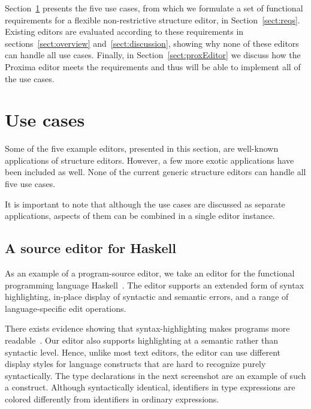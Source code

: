 Section~\ref{sect:usecases} presents the five use cases, from which we formulate a set of functional requirements for a flexible non-restrictive structure editor, in Section~\ref{sect:reqs}. Existing editors are evaluated according to these requirements in sections~\ref{sect:overview} and~\ref{sect:discussion}, showing why none of these editors can handle all use cases. Finally, in Section~\ref{sect:proxEditor} we discuss how the Proxima editor meets the requirements and thus will be able to implement all of the use cases.

\section{Use cases} \label{sect:usecases}

Some of the five example editors, presented in this section, are well-known applications of structure editors. However, a few more exotic applications have been included as well. None of the current generic structure editors can handle all five use cases.

It is important to note that although the use cases are discussed as separate applications, aspects of them can be combined in a single editor instance.


%								
\subsection{A source editor for Haskell}  \label{sect:sourceeditor} 

As an example of a program-source editor, we take an editor for the functional programming language Haskell~\cite{peytonJones03haskell}. The editor supports an extended form of syntax highlighting, in-place display of syntactic and semantic errors, and a range of language-specific edit operations. 

There exists evidence showing that syntax-highlighting makes programs more readable~\cite{baecker88readability, omanCook90typography}. Our editor also supports highlighting at a semantic rather than syntactic level. Hence, unlike most text editors, the editor can use different display styles for language constructs that are hard to recognize purely syntactically. The type declarations in the next screenshot are an example of such a construct. Although syntactically identical, identifiers in type expressions are colored differently from identifiers in ordinary expressions.

 
